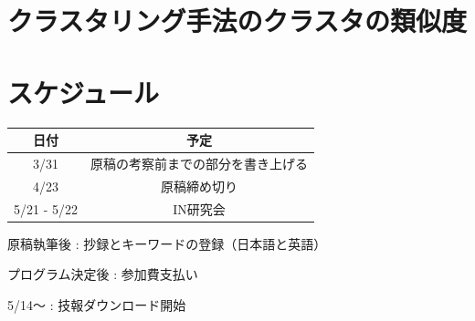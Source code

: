 \documentclass[a4j]{jarticle}
\begin{document}
\section{クラスタリング手法のクラスタの類似度}

\section{スケジュール}
\begin{table}[H]
\begin{tabular}{|c|c|}
\hline
日付&予定\\
\hline
3/31&原稿の考察前までの部分を書き上げる\\
\hline
4/23&原稿締め切り\\
\hline
5/21 - 5/22&IN研究会\\
\hline
\end{tabular}
\end{table}
原稿執筆後 : 抄録とキーワードの登録（日本語と英語）

プログラム決定後 : 参加費支払い

5/14～ : 技報ダウンロード開始
\end{document}
